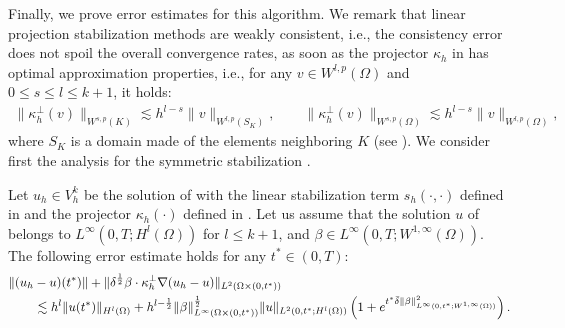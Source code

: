 Finally, we prove error estimates for this algorithm. We remark that linear projection stabilization methods are weakly consistent, i.e., the consistency error does not spoil the overall convergence rates, as soon as the projector $\kappa_h$ in  has optimal approximation properties, i.e., for any $v\in W^{l,p}(\Omega)$ and $0\leq s \leq l \leq k+1$, it holds:
\begin{align}\label{eq-orthapprox}
\|\kappa_h^\perp(v)\|_{W^{s,p}(K)} \lesssim h^{l-s} \|v\|_{W^{l,p}(S_K)}, \qquad 
\|\kappa_h^\perp(v)\|_{W^{s,p}(\Omega)} \lesssim h^{l-s} \|v\|_{W^{l,p}(\Omega)},
\end{align}
where $S_K$ is a domain made of the elements neighboring $K$ (see \cite{brenner_mathematical_2010}).  We consider first the analysis for the  symmetric stabilization .
\begin{theorem}[Convergence]\label{th:conv}
Let $u_h \in V_h^k$ be the solution of  with the linear stabilization term $s_h(\cdot,\cdot)$ defined in    and the projector $\kappa_h(\cdot)$ defined in . Let us assume that the solution $u$ of  belongs to $L^\infty(0,T;H^l(\Omega))$ for $l \leq k+1$, and $\beta\in L^\infty(0,T;W^{1,\infty}(\Omega))$. The following error estimate holds for any $t^* \in (0,T)$:
\begin{align*}
& \|(u_h-u)(t^*)\| + \| \delta^\frac{1}{2} \beta \cdot \kappa_h^\perp \nabla  (u_h-u) \|_{L^2(\Omega \times (0,t^*))}   \\
& \qquad \lesssim 
  h^{l} \|u(t^*)\|_{H^l(\Omega)}  +  h^{l-\frac{1}{2}}\|\beta\|_{L^{\infty}(\Omega \times (0,t^*))}^{\frac{1}{2}} \|u\|_{L^2(0,t^*;H^l(\Omega))} \left( 1 + e^{t^* {\bar \delta } \|\beta  \|^2_{L^\infty(0,t^*;W^{1,\infty}(\Omega))}}
\right). 
\end{align*}
\end{theorem}


